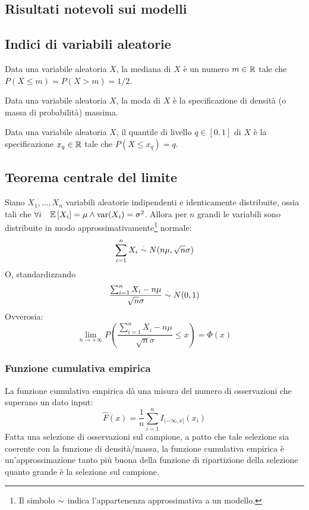 \subsection{Risultati notevoli sui modelli}

\subsection{Indici di variabili aleatorie}
\begin{defin}
	Data una variabile aleatoria $X$, la mediana di $X$ è un numero $m\in\mathbb R$ tale che $P(X\leq m) = P(X>m) = 1/2$.
\end{defin}

\begin{defin}
	Data una variabile aleatoria $X$, la moda di $X$ è la specificazione di densità (o massa di probabilità) massima.
\end{defin}

\begin{defin}
	Data una variabile aleatoria $X$, il quantile di livello $q\in[0,1]$ di $X$ è la specificazione $x_q\in\mathbb R$ tale che $P(X\leq x_q) = q$.
\end{defin}


\subsection{Teorema centrale del limite}
\begin{teor}
	Siano $X_1,\dots,X_n$ variabili aleatorie indipendenti e identicamente distribuite, ossia tali che $\forall i\quad\mathbb{E}\left[ X_i \right]=\mu\land\operatorname{var}(X_i)=\sigma^2$. Allora per $n$ grandi le variabili sono distribuite in modo approssimativamente\footnote{Il simbolo $\overset{\cdot}{\sim}$ indica l'appartenenza approssimativa a un modello.} normale:
	\begin{gather*}
		\sum_{i=1}^n X_i \overset{\cdot}{\sim} N(n\mu,\sqrt{n}\sigma) \\
	\end{gather*}
	O, standardizzando
	\begin{equation*}
		\frac{\sum_{i=1}^n X_i-n\mu}{\sqrt{n}\sigma} \overset{\cdot}{\sim} N(0,1)
	\end{equation*}
	Ovverosia:
	\begin{equation*}
		\lim_{n\to+\infty} P\left(\frac{\sum_{i=1}^n X_i-n\mu}{\sqrt{n}\sigma}\leq x\right) = \Phi(x)
	\end{equation*}
\end{teor}

\subsubsection{Funzione cumulativa empirica}
La funzione cumulativa empirica dà una misura del numero di osservazioni che superano un dato input:
\begin{equation*}
	\hat F(x) = \frac{1}{n} \sum_{i=1}^n I_{(-\infty,x]}(x_i)
\end{equation*}
Fatta una selezione di osservazioni sul campione, a patto che tale selezione sia coerente con la funzione di densità/massa, la funzione cumulativa empirica è un'approssimazione tanto più buona della funzione di ripartizione della selezione quanto grande è la selezione sul campione.

